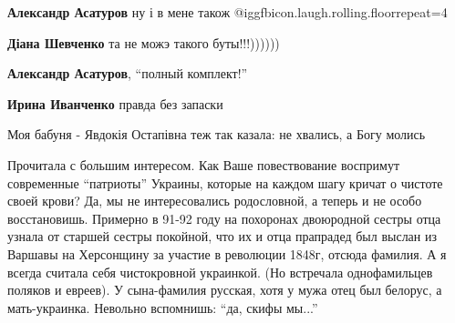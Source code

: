 \begin{itemize}
\begin{itemize}
\begin{itemize}
\textbf{Александр Асатуров} ну і в мене також @igg{fbicon.laugh.rolling.floor}{repeat=4} 

\textbf{Діана Шевченко} та не можэ такого буты!!!))))))

\textbf{Александр Асатуров}, \enquote{полный комплект!}

\textbf{Ирина Иванченко} правда без запаски
\end{itemize} %

\end{itemize} %

Моя бабуня - Явдокія Остапівна теж так казала: не хвались, а Богу молись


Прочитала с большим интересом. Как Ваше повествование воспримут современные
\enquote{патриоты} Украины, которые на каждом шагу кричат о чистоте своей крови? Да, мы
не интересовались родословной, а теперь и не особо восстановишь. Примерно в
91-92 году на похоронах двоюродной сестры отца узнала от старшей сестры
покойной, что их и отца прапрадед был выслан из Варшавы на Херсонщину за
участие в революции 1848г, отсюда фамилия. А я всегда считала себя чистокровной
украинкой. (Но встречала однофамильцев поляков и евреев). У сына-фамилия
русская, хотя у мужа отец был белорус, а мать-украинка. Невольно вспомнишь: \enquote{да,
скифы мы...}

\end{itemize} %
